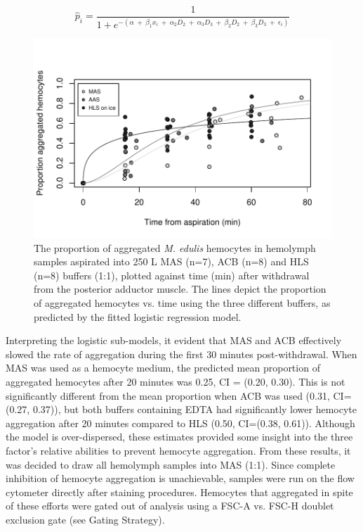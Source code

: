 \begin{equation}
\label{eq:logit}
\hat{p}_{i} = \dfrac{1}{1 + e^{-(\alpha \: + \: \beta_{1} x_{i} \: + \: \alpha_{2} D_{2} \: + \: \alpha_{3} D_{3} \: + \: \beta_{2} D_{2} \: + \: \beta_{3} D_{3} \: + \: \epsilon_{i})}}
\end{equation}

\begin{figure}[!ht]
    \centering
    \includegraphics[width=1.0\textwidth]{figures/greys368.pdf}
    \caption{The proportion of aggregated \emph{M. edulis} hemocytes in hemolymph samples aspirated into 250 \micro L MAS (n=7), ACB (n=8) and HLS (n=8) buffers (1:1), plotted against time (min) after withdrawal from the posterior adductor muscle. The lines depict the proportion of aggregated hemocytes vs. time using the three different buffers, as predicted by the fitted logistic regression model.}
    \label{fig:aggregation}
\end{figure}

Interpreting the logistic sub-models, it evident that MAS and ACB effectively slowed the rate of aggregation during the first 30 minutes post-withdrawal. When MAS was used as a hemocyte medium, the predicted mean proportion of aggregated hemocytes after 20 minutes was 0.25, CI = (0.20, 0.30). This is not significantly different from the mean proportion when ACB was used (0.31, CI=(0.27, 0.37)), but both buffers containing EDTA had significantly lower hemocyte aggregation after 20 minutes compared to HLS (0.50, CI=(0.38, 0.61)). Although the model is over-dispersed, these estimates provided some insight into the three factor's relative abilities to prevent hemocyte aggregation. From these results, it was decided to draw all hemolymph samples into MAS (1:1). Since complete inhibition of hemocyte aggregation is unachievable, samples were run on the flow cytometer directly after staining procedures. Hemocytes that aggregated in spite of these efforts were gated out of analysis using a FSC-A vs. FSC-H doublet exclusion gate (see Gating Strategy). 

